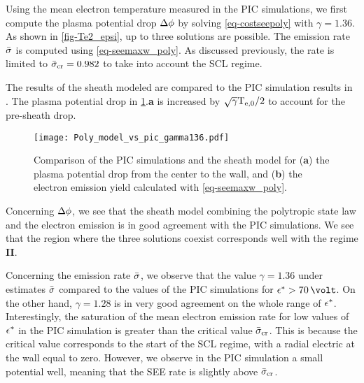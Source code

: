     Using the mean electron temperature measured in the \ac{PIC} simulations, we first compute the plasma potential drop $\Delta \phi$ by solving \cref{eq-costseepoly} with $\gamma=1.36$.
    As shown in \cref{fig-Te2_epsi}, up to three solutions are possible.
    The emission rate $ \bar{\sigma }$ is computed using \cref{eq-seemaxw_poly}.
    As discussed previously, the rate is limited to $ \bar{\sigma }_{\rm cr}=0.982$ to take into account the \ac{SCL} regime.

    The results of the sheath modeled are compared to the \ac{PIC} simulation results in .
    The plasma potential drop in \cref{fig-Poly_model_vs_pic}.{\bf a} is increased by $\sqrt{\gamma} \mathrm{T_{e, 0}}/2$ to account for the pre-sheath drop.
    
    \begin{figure}[!hbt]
      \centering
      \texttt{[image: Poly\_model\_vs\_pic\_gamma136.pdf]}
      \caption{Comparison of the PIC simulations and the sheath model for ({\bf a}) the plasma potential drop from the center to the wall, and ({\bf b}) the electron emission yield calculated with \cref{eq-seemaxw_poly}. }
      \label{fig-Poly_model_vs_pic}
    \end{figure}

    Concerning $\Delta \phi$, we see that the sheath model combining the polytropic state law and the electron emission is in good agreement with the \ac{PIC} simulations.
    We see that the region where the three solutions coexist corresponds well with the regime {\bf II}.

    Concerning the emission rate $ \bar{\sigma }$, we observe that the value $\gamma=1.36$ under estimates $ \bar{\sigma }$ compared to the values of the \ac{PIC} simulations for $\crover > 70\,\volt$.
    On the other hand, $\gamma=1.28$ is in very good agreement on the whole range of $\epsilon^{*}$.
    Interestingly, the saturation of the mean electron emission rate for low values of $\epsilon^{*}$ in the \ac{PIC} simulation is greater than the critical value $ \bar{\sigma }_{\rm cr}$.
    This is because the critical value corresponds to the start of the \ac{SCL} regime, with a radial electric at the wall equal to zero.
    However, we observe in the \ac{PIC} simulation a small potential well, meaning that the \ac{SEE} rate is slightly above $ \bar{\sigma }_{\rm cr}$.
    
